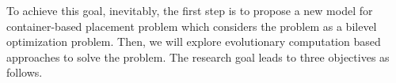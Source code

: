  To achieve this goal, inevitably, the first step is to propose a new model for container-based placement problem which considers the problem as a bilevel optimization problem. Then, we will explore evolutionary computation based approaches to solve the problem. The research goal leads to three objectives as follows.

